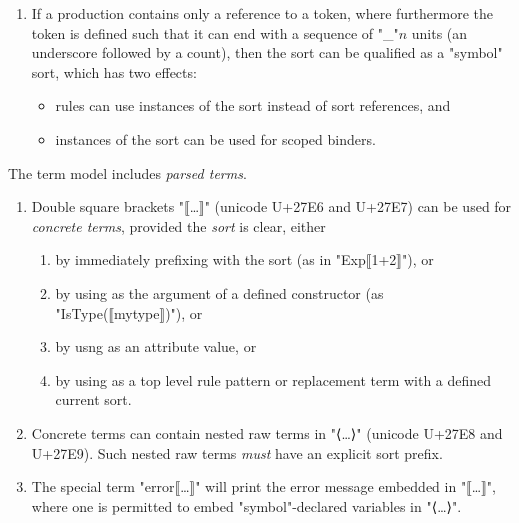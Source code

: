\documentclass[11pt]{article} %
\begin{document}
\begin{manual}
\begin{enumerate}
  \item If a production contains only a reference to a token, where furthermore the token is defined
    such that it can end with a sequence of "_"$n$ units (an underscore followed by a count), then
    the sort can be qualified as a "symbol" sort, which has two effects:
    \begin{itemize}
    \item rules can use instances of the sort instead of sort references, and
    \item instances of the sort can be used for scoped binders.
    \end{itemize}

  \end{enumerate}
\end{manual}

\begin{manual}\label{man:parsed}
  The term model includes \emph{parsed terms}.
  \begin{enumerate}

  \item Double square brackets "⟦…⟧" (unicode U+27E6 and U+27E7) can be used for \emph{concrete
      terms}, provided the \emph{sort} is clear, either
    \begin{enumerate}
    \item by immediately prefixing with the sort (as in "Exp⟦1+2⟧"), or
    \item by using as the argument of a defined constructor (as "IsType(⟦mytype⟧)"), or
    \item by usng as an attribute value, or
    \item by using as a top level rule pattern or replacement term with a defined current sort.
    \end{enumerate}

  \item Concrete terms can contain nested raw terms in "⟨…⟩" (unicode U+27E8 and U+27E9). Such
    nested raw terms \emph{must} have an explicit sort prefix.

  \item The special term "error⟦…⟧" will print the error message embedded in "⟦…⟧", where one is
    permitted to embed "symbol"-declared variables in "⟨…⟩".

  \end{enumerate}

\end{manual}
\end{document}
